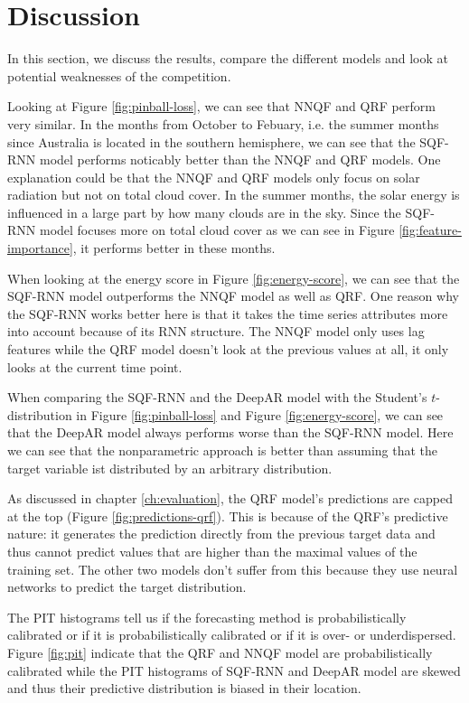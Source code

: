 \section{Discussion}
\label{sec:discussion}

In this section, we discuss the results, compare the different 
models and look at potential weaknesses of the competition. 

Looking at Figure \ref{fig:pinball-loss}, we can see that NNQF and QRF perform very similar. 
In the months from October to Febuary, i.e. the summer months since 
Australia is located in the southern hemisphere, we can see that 
the SQF-RNN model performs noticably better than the NNQF and QRF models. 
One explanation could be that the NNQF and QRF models only focus on solar 
radiation but not on total cloud cover. 
In the summer months, the solar energy is influenced in a large part by 
how many clouds are in the sky. Since the SQF-RNN model focuses more on 
total cloud cover as we can see in Figure \ref{fig:feature-importance}, 
it performs better in these months. 

When looking at the energy score in Figure \ref{fig:energy-score}, 
we can see that the SQF-RNN model outperforms the NNQF model as well as QRF.
One reason why the SQF-RNN works better here is that it takes 
the time series attributes more into account because of its RNN structure. 
The NNQF model only uses lag features while the QRF model doesn't look 
at the previous values at all, it only looks at the current time point.

When comparing the SQF-RNN and the DeepAR model with 
the Student's \(t\)-distribution in Figure \ref{fig:pinball-loss} and 
Figure \ref{fig:energy-score}, we can see that the DeepAR model 
always performs worse than the SQF-RNN model. 
Here we can see that the nonparametric approach is better than assuming 
that the target variable ist distributed by an arbitrary distribution. 

As discussed in chapter \ref{ch:evaluation}, 
the QRF model's predictions are capped 
at the top (Figure \ref{fig:predictions-qrf}). 
This is because of the QRF's predictive nature: it generates 
the prediction directly from the previous target data 
and thus cannot predict values 
that are higher than the maximal values of the training set. 
The other two models don't suffer from this because they use 
neural networks to predict the target distribution.

The PIT histograms tell us if the forecasting method is probabilistically 
calibrated or if it is probabilistically calibrated or 
if it is over- or underdispersed. 
Figure \ref{fig:pit} indicate that the QRF and NNQF model are 
probabilistically calibrated while the PIT histograms of SQF-RNN 
and DeepAR model are skewed and thus their predictive distribution is 
biased in their location.

